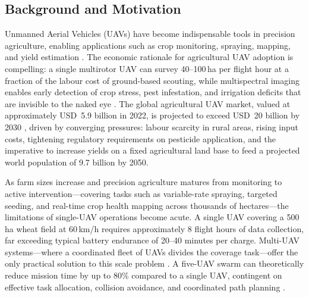 \documentclass[review,3p,times]{elsarticle}
\begin{document}
\subsection{Background and Motivation}

Unmanned Aerial Vehicles (UAVs) have become indispensable tools in precision agriculture, enabling applications such as crop monitoring, spraying, mapping, and yield estimation \cite{zhang2012,tsouros2019,puri2017,mogili2018,hunt2018}. The economic rationale for agricultural UAV adoption is compelling: a single multirotor UAV can survey 40--100\,ha per flight hour at a fraction of the labour cost of ground-based scouting, while multispectral imaging enables early detection of crop stress, pest infestation, and irrigation deficits that are invisible to the naked eye \cite{hunt2018,zhang2012}. The global agricultural UAV market, valued at approximately USD~5.9 billion in 2022, is projected to exceed USD~20 billion by 2030 \cite{tsouros2019,mogili2018}, driven by converging pressures: labour scarcity in rural areas, rising input costs, tightening regulatory requirements on pesticide application, and the imperative to increase yields on a fixed agricultural land base to feed a projected world population of 9.7 billion by 2050.

As farm sizes increase and precision agriculture matures from monitoring to active intervention---covering tasks such as variable-rate spraying, targeted seeding, and real-time crop health mapping across thousands of hectares---the limitations of single-UAV operations become acute. A single UAV covering a 500\,ha wheat field at 60\,km/h requires approximately 8 flight hours of data collection, far exceeding typical battery endurance of 20--40 minutes per charge. Multi-UAV systems---where a coordinated fleet of UAVs divides the coverage task---offer the only practical solution to this scale problem \cite{chung2018,gupta2016}. A five-UAV swarm can theoretically reduce mission time by up to 80\% compared to a single UAV, contingent on effective task allocation, collision avoidance, and coordinated path planning \cite{chung2018}.
\end{document}
